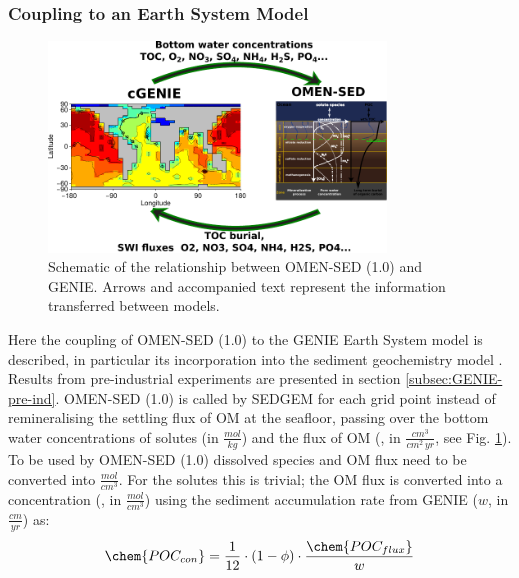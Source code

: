 \documentclass[gmd, manuscript]{copernicus}
\begin{document}
\subsubsection{Coupling to an Earth System Model}\label{subsubsec:ESM_coupling}
\begin{figure}[tbp]
\begin{center}
	\includegraphics[width=0.8\textwidth]{figures/OMEN-GENIE-coupling.pdf}
	\caption{Schematic of the relationship between OMEN-SED (1.0) and GENIE. Arrows and accompanied text represent the information transferred between models. }
	\label{fig:OMEN-GENIE-coupling}
	\end{center}
\end{figure}Here the coupling of OMEN-SED (1.0) to the GENIE Earth System model is described, in particular its incorporation into the sediment geochemistry model \citep[SEDGEM,][]{ridgwell_regulation_2007}. 
Results from pre-industrial experiments are presented in section \ref{subsec:GENIE-pre-ind}. OMEN-SED (1.0) is called by SEDGEM for each grid point instead of remineralising the settling flux of OM at the seafloor, passing over the 
bottom water concentrations of solutes (in $\frac{mol}{kg}$) and the flux of OM (, in $\frac{cm^3}{cm^2\,yr}$, see Fig. \ref{fig:OMEN-GENIE-coupling}). 
To be used by OMEN-SED (1.0) dissolved species and OM flux need to be converted into $\frac{mol}{cm^3}$. 
For the solutes this is trivial; the OM flux is converted into a concentration (, in $\frac{mol}{cm^3}$) using the sediment accumulation rate from GENIE ($w$, in $\frac{cm}{yr}$) as:
\begin{equation}
 \chem{POC_{con}} = \frac{1}{12}\cdot(1-\phi)\cdot \frac{\chem{POC_{flux}}}{w}
\end{equation}
\end{document}
